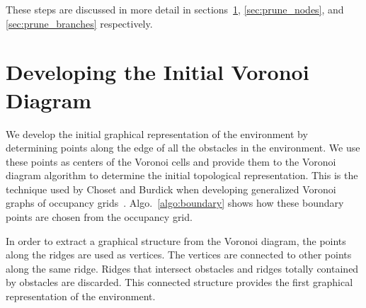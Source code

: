 \documentclass[letterpaper, 10pt, conference]{ieeeconf}
\begin{document}
These steps are discussed in more detail in sections~\ref{sec:voronoi},
\ref{sec:prune_nodes}, and \ref{sec:prune_branches} respectively.


\section{Developing the Initial Voronoi Diagram}

\label{sec:voronoi}

We develop the initial graphical representation of the environment by
determining points along the edge of all the obstacles in the environment. We
use these points as centers of the Voronoi cells and provide them to the
Voronoi diagram algorithm to determine the initial topological representation.
This is the technique used by Choset and Burdick when developing generalized
Voronoi graphs of occupancy grids~\cite{choset2000sensor}.
Algo.~\ref{algo:boundary} shows how these boundary points are chosen from the
occupancy grid.

In order to extract a graphical structure from the Voronoi diagram, the points
along the ridges are used as vertices. The vertices are connected to other
points along the same ridge. Ridges that intersect obstacles and ridges totally
contained by obstacles are discarded. This connected structure provides the
first graphical representation of the environment.

\end{document}
